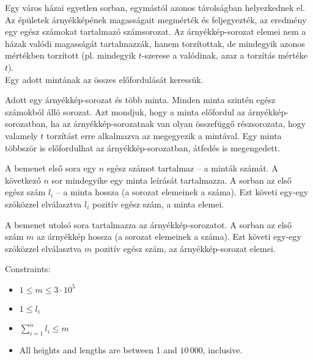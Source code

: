 




Egy város házai egyetlen sorban, egymástól azonos távolságban helyezkednek el.
Az épületek árnyékképének magasságait megmérték és feljegyezték, az eredmény egy egész számokat tartalmazó számsorozat.
Az árnyékkép-sorozat elemei nem a házak valódi magasságát tartalmazzák, hanem torzítottak, de mindegyik azonos mértékben torzított (pl. mindegyik $t$-szerese a valódinak, azaz a torzítás mértéke $t$).\\
Egy adott mintának az összes előfordulását keressük.


Adott egy árnyékkép-sorozat és több minta. Minden minta szintén egész számokból álló sorozat.
Azt mondjuk, hogy a minta előfordul az árnyékkép-sorozatban, ha az árnyékkép-sorozatnak van olyan összefüggő részsorozata, hogy valamely $t$ torzítást erre alkalmazva az megegyezik a mintával.
Egy minta többször is előfordulhat az árnyékkép-sorozatban, átfedés is megengedett.



A bemenet első sora egy $n$ egész számot tartalmaz -- a minták számát.
A következő $n$ sor mindegyike egy minta leírását tartalmazza. A sorban az első egész szám $l_i$ -- a minta hossza (a sorozat elemeinek a száma). Ezt követi egy-egy szóközzel elválasztva $l_i$ pozitív egész szám, a minta elemei.

A bemenet utolsó sora tartalmazza az árnyékkép-sorozatot. A sorban az első szám $m$ az árnyékkép hossza (a sorozat elemeinek a száma). Ezt követi egy-egy szóközzel elválasztva $m$ pozitív egész szám, az árnyékkép-sorozat elemei.

\bigskip

Constraints:
\begin{itemize}\itemsep -2pt
\item
$1 \leq m \leq 3\cdot10^5$
\item
$1 \leq l_i$
\item
$\sum^{n}_{i=1} l_i \leq m$
\item
All heights and lengths are between 1 and $10\,000$, inclusive.
\end{itemize}



